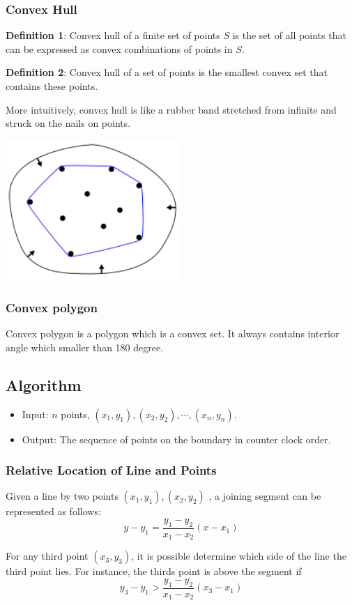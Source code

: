 \subsubsection{Convex Hull}
\textbf{Definition 1}: Convex hull of a finite set of points $S$ is the set of 
all points that can be expressed as convex combinations of points in $S$. 

\textbf{Definition 2}: Convex hull of a set of points is the smallest convex 
set that contains these points.
 
More intuitively, convex hull is like a rubber band stretched from infinite and 
struck on the nails on points.
\centerline{\includegraphics[width=0.5\textwidth]{ConvexHull.png}}
\subsubsection{Convex polygon}
Convex polygon is a polygon which is a convex set. It always contains interior 
angle which smaller than 180 degree.
\subsection{Algorithm}
\begin{itemize}
 \item Input: $n$ points, $(x_1, y_1), (x_2, y_2), \cdots, (x_n, y_n)$.
 \item Output: The sequence of points on the boundary in counter clock order.
\end{itemize}

\subsubsection{Relative Location of Line and Points}
Given a line by two points $(x_1, y_1), (x_2, y_2)$ , a joining segment can 
be represented as follows:
\[y - y_1 = \frac{y_1 - y_2}{x_1 - x_2} (x - x_1)\]

For any third point $(x_3, y_3)$, it is possible determine which side of the 
line the third point lies. For instance, the thirds point is above the segment 
if 
\[y_3 - y_1 > \frac{y_1 - y_2}{x_1 - x_2} (x_3 - x_1)\]

